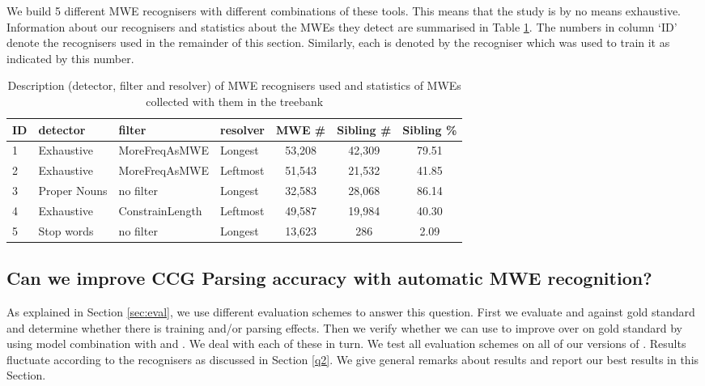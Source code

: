 \documentclass[output=paper]{LSP/langsci}
\begin{document}
\indent We build 5 different MWE recognisers with different combinations of these tools. This means that the study is by no means exhaustive. Information about our recognisers and statistics about the MWEs they detect are summarised in Table \ref{tab:rec}. The numbers in column `ID' denote the recognisers used in the remainder of this section. Similarly, each \modelB is denoted by the recogniser which was used to train it as indicated by this number.\\

\begin{table}[H]
    \footnotesize
    \def\arraystretch{1.20} 
    \begin{tabular}{| l | l | l | l | c | c | c |} \hline
        \textbf{ID}
        & \textbf{detector}
        & \textbf{filter}
        & \textbf{resolver}
        & \textbf{MWE \#}%
        & \textbf{Sibling \#}%
        & \textbf{Sibling \%}
        \\ \hline
        1 & Exhaustive & MoreFreqAsMWE & Longest & 53,208 & 42,309 & 79.51 \\
        2 & Exhaustive & MoreFreqAsMWE & Leftmost & 51,543 & 21,532 & 41.85 \\
        3 & Proper Nouns &no filter & Longest & 32,583 & 28,068 & 86.14 \\
        4 & Exhaustive & ConstrainLength & Leftmost & 49,587 & 19,984 & 40.30 \\
        5 & Stop words & no filter & Longest & 13,623 & 286 & 2.09 \\
        \hline
    \end{tabular}
    \caption{Description (detector, filter and resolver) of MWE recognisers used and statistics of MWEs collected with them in the treebank}
    \label{tab:rec}
\end{table}


\subsection{Can we improve CCG Parsing accuracy with automatic MWE recognition?}
\label{q1}
\indent As explained in Section \ref{sec:eval}, we use different evaluation schemes to answer this question. First we evaluate \modelB and \modelA against gold standard and determine whether there is training and/or parsing effects. Then we verify whether we can use \modelB to improve over \modelA on gold standard by using model combination with \modelA and \modelB. We deal with each of these in turn. We test all evaluation schemes on all of our versions of \modelB. Results fluctuate according to the recognisers as discussed in Section \ref{q2}. We give general remarks about results and report our best results in this Section.
\end{document}
